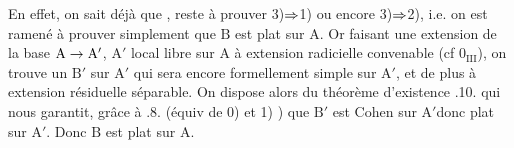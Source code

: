 En effet, on sait déjà que , reste à prouver  3)$\Rightarrow$1)  ou encore 3)$\Rightarrow$2), i.e. on est ramené à prouver simplement que $\mathrm B$ est plat sur $\mathrm A$. Or faisant une extension de la base $\mathrm A\to\mathrm A'$, $\mathrm A'$ local libre  sur $\mathrm A$ à extension radicielle convenable (cf $0_{\mathrm{III}}$), on trouve un $\mathrm B'$  sur $\mathrm A'$ qui sera encore formellement simple sur $\mathrm A'$, et de plus à extension résiduelle  séparable\handwritten{$/^{\circ}$}. On dispose alors du théorème d'existence .10. qui nous garantit, grâce à .8. (équiv de 0) et 1) ) que $\mathrm B'$ est Cohen sur $\mathrm A'$donc plat sur $\mathrm A'$. Donc $\mathrm B$ est plat sur $\mathrm A$.

